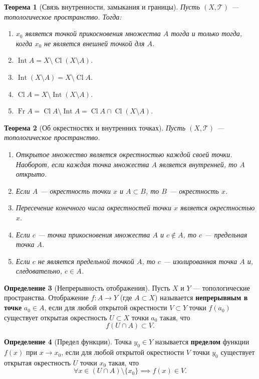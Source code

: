 \documentclass[12pt,a4paper]{article}
\newtheorem{theorem}{Теорема}[section]
\theoremstyle{definition}
\newtheorem{definition}[theorem]{Определение}
\newcommand{\Int}{\operatorname{Int}}
\newcommand{\Cl}{\operatorname{Cl}}
\newcommand{\Fr}{\operatorname{Fr}}
\begin{document}
\begin{theorem}[Связь внутренности, замыкания и границы]
Пусть $(X, \mathcal{T})$ --- топологическое пространство. Тогда:
\begin{enumerate}
    \item $x_0$ является точкой прикосновения множества $A$ тогда и только тогда, когда $x_0$ не является внешней точкой для $A$.
    \item $\Int A = X \setminus \Cl(X \setminus A)$.
    \item $\Int(X \setminus A) = X \setminus \Cl A$.
    \item $\Cl A = X \setminus \Int(X \setminus A)$.
    \item $\Fr A = \Cl A \setminus \Int A = \Cl A \cap \Cl(X \setminus A)$.
\end{enumerate}
\end{theorem}

\begin{theorem}[Об окрестностях и внутренних точках]
Пусть $(X, \mathcal{T})$ --- топологическое пространство.
\begin{enumerate}
    \item Открытое множество является окрестностью каждой своей точки. Наоборот, если каждая точка множества $A$ является внутренней, то $A$ открыто.
    \item Если $A$ --- окрестность точки $x$ и $A \subset B$, то $B$ --- окрестность $x$.
    \item Пересечение конечного числа окрестностей точки $x$ является окрестностью $x$.
    \item Если $c$ --- точка прикосновения множества $A$ и $c \notin A$, то $c$ --- предельная точка $A$.
    \item Если $c$ не является предельной точкой $A$, то $c$ --- изолированная точка $A$ и, следовательно, $c \in A$.
\end{enumerate}
\end{theorem}

\begin{definition}[Непрерывность отображения]
Пусть $X$ и $Y$ --- топологические пространства. Отображение $f: A \to Y$ (где $A \subset X$) называется \textbf{непрерывным в точке} $a_0 \in A$, если для любой открытой окрестности $V \subset Y$ точки $f(a_0)$ существует открытая окрестность $U \subset X$ точки $a_0$ такая, что
$$f(U \cap A) \subset V.$$
\end{definition}

\begin{definition}[Предел функции]
Точка $y_0 \in Y$ называется \textbf{пределом} функции $f(x)$ при $x \to x_0$, если для любой открытой окрестности $V$ точки $y_0$ существует открытая окрестность $U$ точки $x_0$ такая, что
$$\forall x \in (U \cap A) \setminus \{x_0\} \implies f(x) \in V.$$
\end{definition}
\end{document}
